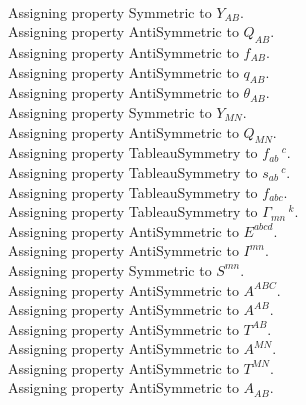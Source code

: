 \documentclass[11pt]{article}
\begin{document}
\\
Assigning property Symmetric to ${Y}_{A B}$.
\\
Assigning property AntiSymmetric to ${Q}_{A B}$.
\\
Assigning property AntiSymmetric to ${f}_{A B}$.
\\
Assigning property AntiSymmetric to ${q}_{A B}$.
\\
Assigning property AntiSymmetric to ${\theta}_{A B}$.
\\
Assigning property Symmetric to ${Y}_{M N}$.
\\
Assigning property AntiSymmetric to ${Q}_{M N}$.
\\
Assigning property TableauSymmetry to ${f}_{a b}\,^{c}$.
\\
Assigning property TableauSymmetry to ${s}_{a b}\,^{c}$.
\\
Assigning property TableauSymmetry to ${f}_{a b c}$.
\\
Assigning property TableauSymmetry to ${\Gamma}_{m n}\,^{k}$.
\\
Assigning property AntiSymmetric to ${E}^{a b c d}$.
\\
Assigning property AntiSymmetric to ${I}^{m n}$.
\\
Assigning property Symmetric to ${S}^{m n}$.
\\
Assigning property AntiSymmetric to ${A}^{A B C}$.
\\
Assigning property AntiSymmetric to ${A}^{A B}$.
\\
Assigning property AntiSymmetric to ${T}^{A B}$.
\\
Assigning property AntiSymmetric to ${A}^{M N}$.
\\
Assigning property AntiSymmetric to ${T}^{M N}$.
\\
Assigning property AntiSymmetric to ${A}_{A B}$.
\end{document}
